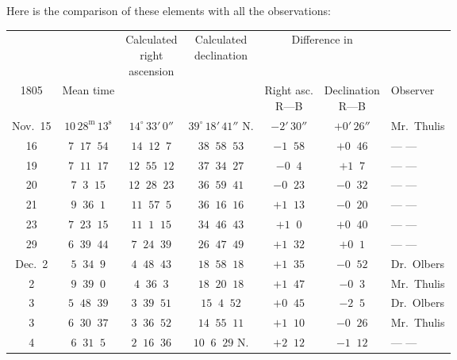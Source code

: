 \par\indent Here is the comparison of these elements with all the observations:



\begin{center}\begingroup
\fontsize{8}{10}\selectfont
\setlength{\tabcolsep}{2pt}\renewcommand{\arraystretch}{1.12}
\begin{tabular}{|c|c|c|c|c|c|l|}
\hline
& & \shortstack{Calculated\\right\\ascension} & \shortstack{Calculated\\declination} & \multicolumn{2}{c|}{Difference in} & \\
1805 & Mean time & & & \shortstack{Right asc.\\R---B} & \shortstack{Declination\\R---B} & Observer \\
\hline
Nov.\ 15 & $10\,28^{\mathrm{m}}\,13^{\mathrm{s}}$ & $14^{\circ}\,33'\,0''$ & $39^{\circ}\,18'\,41''$ N. & $-2'\,30''$ & $+0'\,26''$ & Mr.\ Thulis \\
16 & $7\;\;17\;\;54$ & $14\;\;12\;\;7$ & $38\;\;58\;\;53$ & $-1\;\;58$ & $+0\;\;46$ & --- --- \\
19 & $7\;\;11\;\;17$ & $12\;\;55\;\;12$ & $37\;\;34\;\;27$ & $-0\;\;4$ & $+1\;\;7$ & --- --- \\
20 & $7\;\;3\;\;15$ & $12\;\;28\;\;23$ & $36\;\;59\;\;41$ & $-0\;\;23$ & $-0\;\;32$ & --- --- \\
21 & $9\;\;36\;\;1$ & $11\;\;57\;\;5$ & $36\;\;16\;\;16$ & $+1\;\;13$ & $-0\;\;20$ & --- --- \\
23 & $7\;\;23\;\;15$ & $11\;\;1\;\;15$ & $34\;\;46\;\;43$ & $+1\;\;0$ & $+0\;\;40$ & --- --- \\
29 & $6\;\;39\;\;44$ & $7\;\;24\;\;39$ & $26\;\;47\;\;49$ & $+1\;\;32$ & $+0\;\;1$ & --- --- \\
Dec.\ 2 & $5\;\;34\;\;9$ & $4\;\;48\;\;43$ & $18\;\;58\;\;18$ & $+1\;\;35$ & $-0\;\;52$ & Dr.\ Olbers \\
2 & $9\;\;39\;\;0$ & $4\;\;36\;\;3$ & $18\;\;20\;\;18$ & $+1\;\;47$ & $-0\;\;3$ & Mr.\ Thulis \\
3 & $5\;\;48\;\;39$ & $3\;\;39\;\;51$ & $15\;\;4\;\;52$ & $+0\;\;45$ & $-2\;\;5$ & Dr.\ Olbers \\
3 & $6\;\;30\;\;37$ & $3\;\;36\;\;52$ & $14\;\;55\;\;11$ & $+1\;\;10$ & $-0\;\;26$ & Mr.\ Thulis \\
4 & $6\;\;31\;\;5$ & $2\;\;16\;\;36$ & $10\;\;6\;\;29$ N. & $+2\;\;12$ & $-1\;\;12$ & --- --- \\

\end{tabular}
\end{center}

